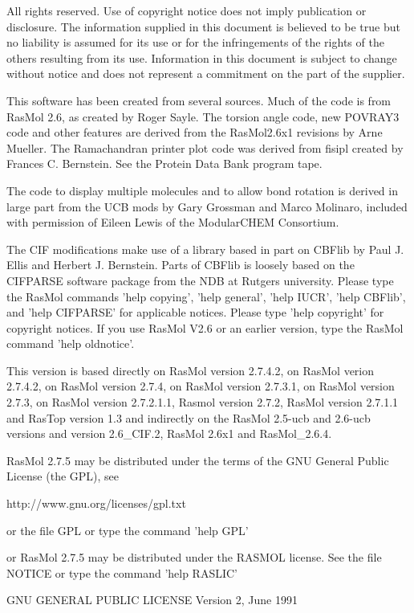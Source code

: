 All rights reserved. Use of copyright notice does not imply publication or
disclosure. The information supplied in this document is believed to be true
but no liability is assumed for its use or for the infringements of the rights
of the others resulting from its use. Information in this document is subject
to change without notice and does not represent a commitment on the part of
the supplier.

This software has been created from several sources.  Much of the code is
from RasMol 2.6, as created by Roger Sayle.
The torsion angle code, new POVRAY3 code and other features are derived from
the RasMol2.6x1 revisions by Arne Mueller.
The Ramachandran printer plot code was derived from fisipl created by Frances C.
Bernstein.  See the Protein Data Bank program tape.

The code to display multiple molecules and to allow bond rotation is derived
in large part from the UCB mods by Gary Grossman and Marco Molinaro,
included with
permission of Eileen Lewis of the ModularCHEM Consortium.

The CIF modifications make use of a library based in part on CBFlib by
Paul J. Ellis and Herbert J. Bernstein.
Parts of CBFlib is loosely based on the CIFPARSE software package from the NDB
at Rutgers university.
Please type the RasMol commands
'help copying',
'help general',
'help IUCR',
'help CBFlib',
 and
'help CIFPARSE'
for applicable notices.  Please type
'help copyright'
for copyright notices.  If you use RasMol V2.6
or an earlier version, type the RasMol command
'help oldnotice'.

This version is based directly on RasMol version 2.7.4.2,
on RasMol verion 2.7.4.2, on RasMol version 2.7.4,
on RasMol version 2.7.3.1, on RasMol version 2.7.3,
on RasMol version 2.7.2.1.1, Rasmol version 2.7.2, RasMol
version 2.7.1.1 and RasTop version 1.3 and indirectly on
the RasMol 2.5-ucb and 2.6-ucb versions and version
2.6_CIF.2, RasMol 2.6x1 and RasMol_2.6.4.

RasMol 2.7.5 may be distributed under the terms of the GNU
General Public License (the GPL), see

          http://www.gnu.org/licenses/gpl.txt

or the file GPL or type the command
'help GPL'

or RasMol 2.7.5 may be distributed under the RASMOL license.
See the file NOTICE
or type the command
'help RASLIC'

                    GNU GENERAL PUBLIC LICENSE
                       Version 2, June 1991

